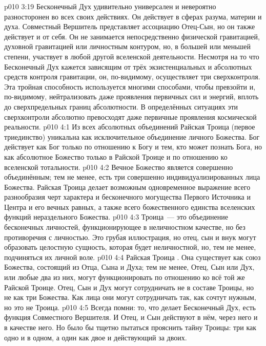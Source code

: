 \vs p010 3:19 \pc Бесконечный Дух удивительно универсален и невероятно разносторонен во всех своих действиях. Он действует в сферах разума, материи и духа. Совместный Вершитель представляет ассоциацию Отец\hyp{}Сын, но он также действует и от себя. Он не занимается непосредственно физической гравитацией, духовной гравитацией или личностным контуром, но, в большей или меньшей степени, участвует в любой другой вселенской деятельности. Несмотря на то что Бесконечный Дух кажется зависящим от трёх экзистенциальных и абсолютных средств контроля гравитации, он, по\hyp{}видимому, осуществляет три сверхконтроля. Эта тройная способность используется многими способами, чтобы превзойти и, по\hyp{}видимому, нейтрализовать даже проявления первичных сил и энергий, вплоть до сверхпредельных границ абсолютности. В определённых ситуациях эти сверхконтроли абсолютно превосходят даже первичные проявления космической реальности.
\vs p010 4:1 Из всех абсолютных объединений Райская Троица (первое триединство) уникальна как исключительное объединение личного Божества. Бог действует как Бог только по отношению к Богу и тем, кто может познать Бога, но как абсолютное Божество только в Райской Троице и по отношению ко вселенской тотальности.
\vs p010 4:2 \pc Вечное Божество является совершенно объединённым; тем не менее, есть три совершенно индивидуализированных лица Божества. Райская Троица делает возможным одновременное выражение всего разнообразия черт характера и бесконечного могущества Первого Источника и Центра и его вечных равных, а также всего божественного единства вселенских функций нераздельного Божества.
\vs p010 4:3 Троица~--- это объединение бесконечных личностей, функционирующее в неличностном качестве, но без противоречия с личностью. Это грубая иллюстрация, но отец, сын и внук могут образовать целостную сущность, которая будет неличностной, но, тем не менее, подчиняться их личной воле.
\vs p010 4:4 Райская Троица . Она существует как союз Божества, состоящий из Отца, Сына и Духа; тем не менее, Отец, Сын или Дух, или любые два из них, могут функционировать по отношению ко всё той же Райской Троице. Отец, Сын и Дух могут сотрудничать не в составе Троицы, но не как три Божества. Как лица они могут сотрудничать так, как сочтут нужным, но это не Троица.
\vs p010 4:5 \pc Всегда помни: то, что делает Бесконечный Дух, есть функция Совместного Вершителя. И Отец, и Сын действуют в нём, через него и в качестве него. Но было бы тщетно пытаться прояснить тайну Троицы: три как одно и в одном, а один как двое и действующий за двоих.
